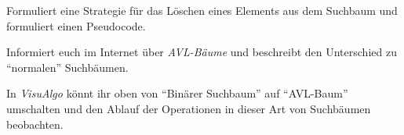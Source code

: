 \documentclass[10pt, a4paper]{scrartcl}
\begin{document}
\begin{aufgabe}[subtitle=Löschen II,symbol=\symPartner\,\symBuch]
	Formuliert eine Strategie für das Löschen eines Elements aus dem Suchbaum und formuliert einen Pseudocode.
	
\end{aufgabe}

\begin{aufgabe}[subtitle=AVL-Bäume,symbol=\symStern\,\symPartner\,\symLaptop]
	Informiert euch im Internet über \emph{AVL-Bäume} und beschreibt den Unterschied zu \enquote{normalen} Suchbäumen. 
	
	In \emph{VisuAlgo} könnt ihr oben von \enquote{Binärer Suchbaum} auf \enquote{AVL-Baum} umschalten und den Ablauf der Operationen in dieser Art von Suchbäumen beobachten.
\end{aufgabe}
\end{document}
